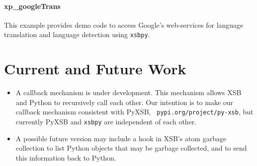 \begin{description}



\end{description}

\paragraph{xp\_googleTrans}
This example provides demo code to access Google's web-services for
language translation and language detection using {\tt xsbpy}.



\section{Current and Future Work}

\begin{itemize}
\item A callback mechanism is under development.  This mechanism
  allows XSB and Python to recursively call each other.  Our intention
  is to make our callback mechanism consistent with PyXSB, {\tt
    pypi.org/project/py-xsb}, but currently PyXSB and {\tt xsbpy} are
  independent of each other.

\item A possible future version may include a hook in XSB's atom
  garbage collection to list Python objects that may be garbage
  collected, and to send this information back to Python.  
\end{itemize}  

